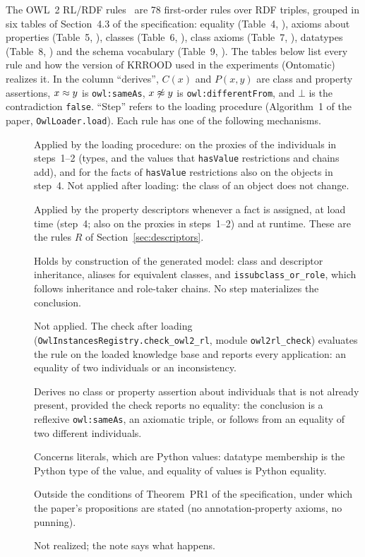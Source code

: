 The OWL~2 RL/RDF rules~\cite{motik2012owl2profiles} are 78 first-order rules over RDF triples, grouped in six tables of
Section~4.3 of the specification: equality (Table~4, ), axioms about properties (Table~5,
), classes (Table~6, ), class axioms (Table~7, ), datatypes (Table~8,
) and the schema vocabulary (Table~9, ). The tables below list every rule and how the
version of KRROOD used in the experiments (Ontomatic) realizes it. In the column ``derives'', $C(x)$ and $P(x,y)$ are
class and property assertions, $x\mathrel{\approx} y$ is \texttt{owl:sameAs}, $x\not\mathrel{\approx} y$ is \texttt{owl:differentFrom},
and $\bot$ is the contradiction \texttt{false}. ``Step'' refers to the loading procedure (Algorithm~1 of the paper,
\texttt{OwlLoader.load}). Each rule has one of the following mechanisms.
\begin{description}
  \item[\rlload] Applied by the loading procedure: on the proxies of the individuals in steps~1--2 (types, and the
    values that \texttt{hasValue} restrictions and chains add), and for the facts of \texttt{hasValue} restrictions also
    on the objects in step~4. Not applied after loading: the class of an object does not change.
  \item[\rlassign] Applied by the property descriptors whenever a fact is assigned, at load time (step~4; also on the
    proxies in steps~1--2) and at runtime. These are the rules $R$ of Section~\ref{sec:descriptors}.
  \item[\rlschema] Holds by construction of the generated model: class and descriptor inheritance, aliases for
    equivalent classes, and \texttt{issubclass\_or\_role}, which follows inheritance and role-taker chains. No step
    materializes the conclusion.
  \item[\rlcheck] Not applied. The check after loading (\texttt{OwlInstancesRegistry.check\_owl2\_rl}, module
    \texttt{owl2rl\_check}) evaluates the rule on the loaded knowledge base and reports every application: an equality
    of two individuals or an inconsistency.
  \item[\rlnone] Derives no class or property assertion about individuals that is not already present, provided
    the check reports no equality: the conclusion is a reflexive \texttt{owl:sameAs}, an axiomatic triple, or follows
    from an equality of two different individuals.
  \item[\rlpython] Concerns literals, which are Python values: datatype membership is the Python type of the value,
    and equality of values is Python equality.
  \item[\rlexcluded] Outside the conditions of Theorem~PR1 of the specification, under which the paper's
    propositions are stated (no annotation-property axioms, no punning).
  \item[\rlunsupported] Not realized; the note says what happens.
\end{description}
